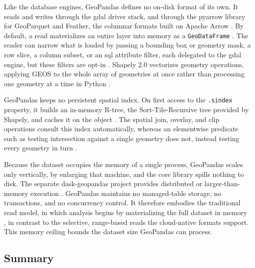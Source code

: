 Like the database engines, GeoPandas defines no on-disk format of its own. It reads and writes through the \acrshort{gdal} driver stack, and through the pyarrow library for GeoParquet and Feather, the columnar formats built on Apache Arrow \parencite{geopandas2024_reading_and_writing_files}. By default, a read materializes an entire layer into memory as a \texttt{GeoDataFrame} \parencite{geopandas2024_reading_and_writing_files, geopandas2024_read_file}. The reader can narrow what is loaded by passing a bounding box or geometry mask, a row slice, a column subset, or an \acrshort{sql} attribute filter, each delegated to the \acrshort{gdal} engine, but these filters are opt-in \parencite{geopandas2024_reading_and_writing_files, geopandas2024_read_file}. Shapely 2.0 vectorizes geometry operations, applying GEOS to the whole array of geometries at once rather than processing one geometry at a time in Python \parencite{geopandas2024_pygeos_to_shapely}.

GeoPandas keeps no persistent spatial index. On first access to the \texttt{.sindex} property, it builds an in-memory R-tree, the Sort-Tile-Recursive tree provided by Shapely, and caches it on the object \parencite{geopandas2024_spatial_indexing}. The spatial join, overlay, and clip operations consult this index automatically, whereas an elementwise predicate such as testing intersection against a single geometry does not, instead testing every geometry in turn \parencite{geopandas2024_spatial_indexing}.

Because the dataset occupies the memory of a single process, GeoPandas scales only vertically, by enlarging that machine, and the core library spills nothing to disk. The separate dask-geopandas project provides distributed or larger-than-memory execution \parencite{geopandas2024_dask_geopandas}. GeoPandas maintains no managed-table storage, no transactions, and no concurrency control. It therefore embodies the traditional read model, in which analysis begins by materializing the full dataset in memory \parencite{jordahl2024_geopandas}, in contrast to the selective, range-based reads the cloud-native formats support. This memory ceiling bounds the dataset size GeoPandas can process.

\subsection{Summary}
\label{background:spatial-data-formats-and-storage-models:summary}

